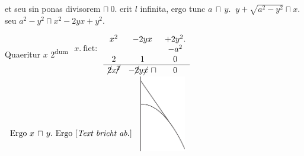 et 
seu 
sin ponas divisorem $\displaystyle \sqcap\ 0.$
erit $\displaystyle l$ infinita,
ergo tunc $\displaystyle a\, \sqcap\, y.\ $
$\displaystyle y + \sqrt{a^2 - y^2} \sqcap x.\ $
seu $\displaystyle a^2 - y^2 \sqcap x^2 - 2yx + y^2.\ $\protect\rule[-4mm]{0mm}{10mm}
Quaeritur $\displaystyle x$ 
2\textsuperscript{dum}
\hspace*{-3,mm}
$\displaystyle%
\begin{array}{l}
x.\ \text{fiet:}\\
\\
\\
\\
\end{array}$%
$\displaystyle%
\begin{array}{ccc}
x^2 & - 2yx & + 2y^2.\\
& & -a^2\\
2 & 1 & 0\\
\hline \cancel{2}x \cancel{^2} & - \cancel{2}y \cancel{x} \ \sqcap & 0
\end{array}$%
$\displaystyle%
\begin{array}{l}
\text{Ergo}\ x \, \sqcap \, y.\ \text{Ergo [\textit{Text bricht ab.}]}\\
\\
\\
\\
\end{array}$
\pend
\pstart
{}
\vspace*{2.0em}
\noindent
\centering
\includegraphics[trim = 0mm -3mm 0mm 0mm, clip, width=0.15\textwidth]{images/LH035,14,02_114v-d5.pdf}\\
\noindent {}\label{LH035,14,02_114v-ref2}
\pend
\count{}
\count{}
\count{}
%
